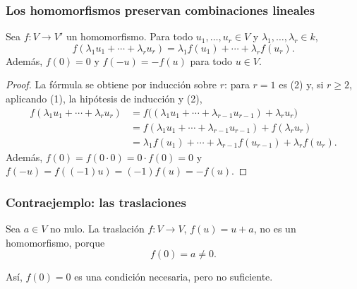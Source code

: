 \begin{frame}
    \frametitle{Los homomorfismos preservan combinaciones lineales}

    \begin{proposition}
        Sea $f\colon V\to V'$ un homomorfismo. Para todo
        $u_1,\ldots,u_r\in V$ y $\lambda_1,\ldots,\lambda_r\in k$,
        \[
            f(\lambda_1u_1+\cdots+\lambda_ru_r)
            =\lambda_1f(u_1)+\cdots+\lambda_rf(u_r).
        \]
        Además, $f(0)=0$ y $f(-u)=-f(u)$ para todo $u\in V$.
    \end{proposition}

    \begin{proof}
        La fórmula se obtiene por inducción sobre $r$: para $r=1$ es (2) y,
        si $r\geq2$, aplicando (1), la hipótesis de inducción y (2),
        \begin{align*}
            f(\lambda_1u_1+\cdots+\lambda_ru_r)
            &=f\bigl((\lambda_1u_1+\cdots+\lambda_{r-1}u_{r-1})+\lambda_ru_r\bigr)\\
            &=f(\lambda_1u_1+\cdots+\lambda_{r-1}u_{r-1})+f(\lambda_ru_r)\\
            &=\lambda_1f(u_1)+\cdots+\lambda_{r-1}f(u_{r-1})+\lambda_rf(u_r).
        \end{align*}
        Además, $f(0)=f(0\cdot 0)=0\cdot f(0)=0$ y
        $f(-u)=f((-1)u)=(-1)f(u)=-f(u)$.
    \end{proof}
\end{frame}


\begin{frame}
    \frametitle{Contraejemplo: las traslaciones}

    \begin{example}
        Sea $a\in V$ no nulo. La \alert{traslación}
        $f\colon V\to V$, $f(u)=u+a$, no es un homomorfismo, porque
        \[
            f(0)=a\neq0.
        \]
    \end{example}

    \medskip

    Así, $f(0)=0$ es una condición \alert{necesaria}, pero no suficiente.

\end{frame}


